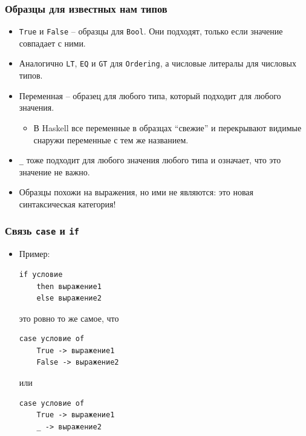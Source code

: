 \documentclass[10pt]{beamer}
\begin{document}
\begin{frame}[fragile]
\frametitle{Образцы для известных нам типов}
\begin{itemize}
    \item \lstinline|True| и \lstinline|False| -- образцы для \lstinline|Bool|. Они подходят, только если значение совпадает с ними. 
    \item Аналогично \lstinline|LT|, \lstinline|EQ| и \lstinline|GT| для \lstinline|Ordering|, а числовые литералы для числовых типов.
    \item Переменная -- образец для любого типа, который подходит для любого значения.
    \begin{itemize}
        \item В Haskell все переменные в образцах \enquote{свежие} и перекрывают видимые снаружи переменные с тем же названием.
    \end{itemize}
\item \lstinline|_| тоже подходит для любого значения любого типа и означает, что это значение не важно.
    \item Образцы похожи на выражения, но ими не являются: это новая синтаксическая категория!
\end{itemize}
\end{frame}

\begin{frame}[fragile]
\frametitle{Связь \lstinline[basicstyle=\ttfamily]|case| и \lstinline[basicstyle=\ttfamily]|if|}
\begin{itemize}
    \item Пример:
\begin{lstlisting}
if условие 
    then выражение1 
    else выражение2
\end{lstlisting}
это ровно то же самое, что
\begin{lstlisting}
case условие of
    True -> выражение1 
    False -> выражение2
\end{lstlisting}
или
\begin{lstlisting}
case условие of
    True -> выражение1 
    _ -> выражение2
\end{lstlisting}
\end{itemize}
\end{frame}
\end{document}
